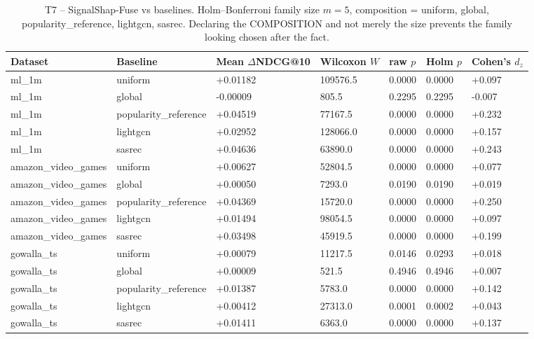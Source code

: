 \begin{table}[htbp]
\centering
\footnotesize
\caption{T7 -- SignalShap-Fuse vs baselines. Holm–Bonferroni family size $m=5$, composition = {uniform, global, popularity\_reference, lightgcn, sasrec}. Declaring the COMPOSITION and not merely the size prevents the family looking chosen after the fact.}
\label{tab:T7_fuse_significance}
\begin{tabular}{lllllll}
\toprule
Dataset & Baseline & Mean $\Delta$NDCG@10 & Wilcoxon $W$ & raw $p$ & Holm $p$ & Cohen's $d_z$ \\
\midrule
ml\_1m & uniform & +0.01182 & 109576.5 & 0.0000 & 0.0000 & +0.097 \\
ml\_1m & global & -0.00009 & 805.5 & 0.2295 & 0.2295 & -0.007 \\
ml\_1m & popularity\_reference & +0.04519 & 77167.5 & 0.0000 & 0.0000 & +0.232 \\
ml\_1m & lightgcn & +0.02952 & 128066.0 & 0.0000 & 0.0000 & +0.157 \\
ml\_1m & sasrec & +0.04636 & 63890.0 & 0.0000 & 0.0000 & +0.243 \\
amazon\_video\_games & uniform & +0.00627 & 52804.5 & 0.0000 & 0.0000 & +0.077 \\
amazon\_video\_games & global & +0.00050 & 7293.0 & 0.0190 & 0.0190 & +0.019 \\
amazon\_video\_games & popularity\_reference & +0.04369 & 15720.0 & 0.0000 & 0.0000 & +0.250 \\
amazon\_video\_games & lightgcn & +0.01494 & 98054.5 & 0.0000 & 0.0000 & +0.097 \\
amazon\_video\_games & sasrec & +0.03498 & 45919.5 & 0.0000 & 0.0000 & +0.199 \\
gowalla\_ts & uniform & +0.00079 & 11217.5 & 0.0146 & 0.0293 & +0.018 \\
gowalla\_ts & global & +0.00009 & 521.5 & 0.4946 & 0.4946 & +0.007 \\
gowalla\_ts & popularity\_reference & +0.01387 & 5783.0 & 0.0000 & 0.0000 & +0.142 \\
gowalla\_ts & lightgcn & +0.00412 & 27313.0 & 0.0001 & 0.0002 & +0.043 \\
gowalla\_ts & sasrec & +0.01411 & 6363.0 & 0.0000 & 0.0000 & +0.137 \\
\bottomrule
\end{tabular}
\end{table}
